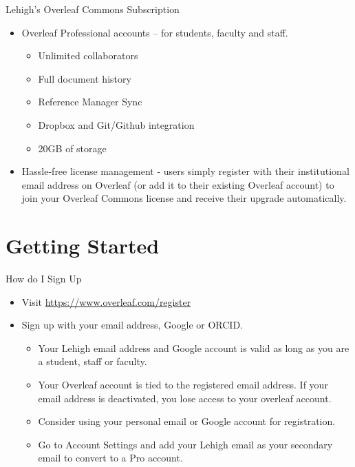 \documentclass[style=lehigh,orient=landscape]{powerdot}
\begin{document}
\begin{wideslide}{Lehigh's Overleaf Commons Subscription}
\begin{itemize}
    \item Overleaf Professional accounts – for students, faculty and staff.
    \begin{itemize}
        \item Unlimited collaborators 
        \item Full document history
        \item Reference Manager Sync
        \item Dropbox and Git/Github integration
        \item 20GB of storage
    \end{itemize}
    \item Hassle-free license management - users simply register with their institutional email address on Overleaf (or add it to their existing Overleaf account) to join your Overleaf Commons license and receive their upgrade automatically.
\end{itemize}
\end{wideslide}

\section[slide=false]{Getting Started}

\begin{wideslide}{How do I Sign Up}
\begin{itemize}
    \item Visit \url{https://www.overleaf.com/register}
    \item Sign up with your email address, Google or ORCID.
    \begin{itemize}
        \item Your Lehigh email address and Google account is valid as long as you are a student, staff or faculty.
        \item Your Overleaf account is tied to the registered email address. If your email address is deactivated, you lose access to your overleaf account.
        \item Consider using your personal email or Google account for registration.
        \item Go to Account Settings and add your Lehigh email as your secondary email to convert to a Pro account.
    \end{itemize}
\end{itemize}
\end{wideslide}
\end{document}
